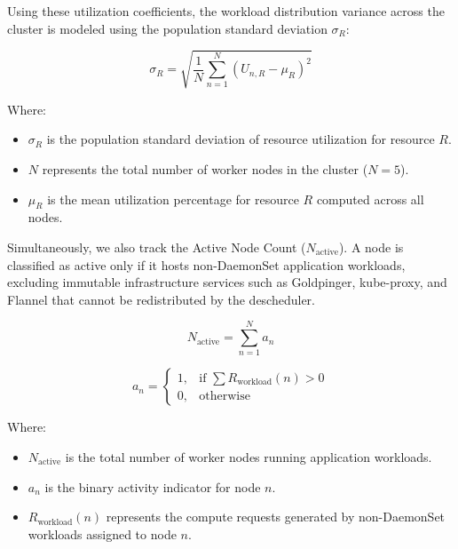 Using these utilization coefficients, the workload distribution variance across the cluster is modeled using the population standard deviation \(\sigma_R\):

\[
\sigma_R
=
\sqrt{
\frac{1}{N}
\sum_{n=1}^{N}
(U_{n,R} - \mu_R)^2
}
\]

\noindent Where:
\begin{itemize}
    \item \(\sigma_R\) is the population standard deviation of resource utilization for resource \(R\).

    \item \(N\) represents the total number of worker nodes in the cluster (\(N=5\)).

    \item \(\mu_R\) is the mean utilization percentage for resource \(R\) computed across all nodes.
\end{itemize}

Simultaneously, we also track the Active Node Count (\(N_{\text{active}}\)). A node is classified as active only if it hosts non-DaemonSet application workloads, excluding immutable infrastructure services such as Goldpinger, kube-proxy, and Flannel that cannot be redistributed by the descheduler.

\[
N_{\text{active}}
=
\sum_{n=1}^{N} a_n
\]

\[
a_n =
\begin{cases}
1, & \text{if } \sum R_{\text{workload}}(n) > 0 \\
0, & \text{otherwise}
\end{cases}
\]

\noindent Where:
\begin{itemize}
    \item \(N_{\text{active}}\) is the total number of worker nodes running application workloads.

    \item \(a_n\) is the binary activity indicator for node \(n\).

    \item \(R_{\text{workload}}(n)\) represents the compute requests generated by non-DaemonSet workloads assigned to node \(n\).
\end{itemize}

